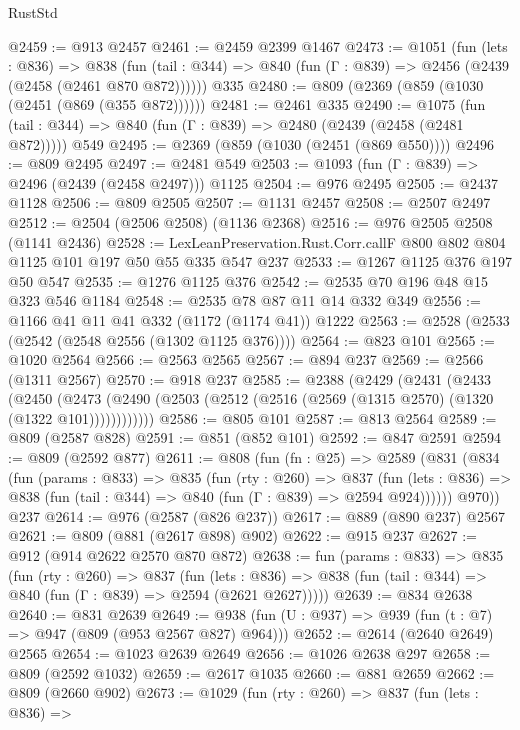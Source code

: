 \begin{lexlean}{RustStd}
\begin{coremodule}
@2459 := @913 @2457
@2461 := @2459 @2399 @1467
@2473 := @1051
    (fun (lets : @836) =>
    @838 (fun (tail : @344) => @840 (fun (Γ : @839) => @2456 (@2439 (@2458 (@2461 @870 @872))))))
    @335
@2480 := @809 (@2369 (@859 (@1030 (@2451 (@869 (@355 @872))))))
@2481 := @2461 @335
@2490 := @1075
    (fun (tail : @344) => @840 (fun (Γ : @839) => @2480 (@2439 (@2458 (@2481 @872)))))
    @549
@2495 := @2369 (@859 (@1030 (@2451 (@869 @550))))
@2496 := @809 @2495
@2497 := @2481 @549
@2503 := @1093 (fun (Γ : @839) => @2496 (@2439 (@2458 @2497))) @1125
@2504 := @976 @2495
@2505 := @2437 @1128
@2506 := @809 @2505
@2507 := @1131 @2457
@2508 := @2507 @2497
@2512 := @2504 (@2506 @2508) (@1136 @2368)
@2516 := @976 @2505 @2508 (@1141 @2436)
@2528 := LexLeanPreservation.Rust.Corr.callF @800 @802 @804 @1125 @101 @197 @50 @55 @335 @547 @237
@2533 := @1267 @1125 @376 @197 @50 @547
@2535 := @1276 @1125 @376
@2542 := @2535 @70 @196 @48 @15 @323 @546 @1184
@2548 := @2535 @78 @87 @11 @14 @332 @349
@2556 := @1166 @41 @11 @41 @332 (@1172 (@1174 @41)) @1222
@2563 := @2528 (@2533 (@2542 (@2548 @2556 (@1302 @1125 @376))))
@2564 := @823 @101
@2565 := @1020 @2564
@2566 := @2563 @2565
@2567 := @894 @237
@2569 := @2566 (@1311 @2567)
@2570 := @918 @237
@2585 := @2388
    (@2429
      (@2431
        (@2433
          (@2450
            (@2473 (@2490 (@2503 (@2512 (@2516 (@2569 (@1315 @2570) (@1320 (@1322 @101))))))))))))
@2586 := @805 @101
@2587 := @813 @2564
@2589 := @809 (@2587 @828)
@2591 := @851 (@852 @101)
@2592 := @847 @2591
@2594 := @809 (@2592 @877)
@2611 := @808
    (fun (fn : @25) =>
    @2589
      (@831
        (@834
          (fun (params : @833) =>
          @835
            (fun (rty : @260) =>
            @837
              (fun (lets : @836) =>
              @838 (fun (tail : @344) => @840 (fun (Γ : @839) => @2594 @924))))))
        @970))
    @237
@2614 := @976 (@2587 (@826 @237))
@2617 := @889 (@890 @237) @2567
@2621 := @809 (@881 (@2617 @898) @902)
@2622 := @915 @237
@2627 := @912 (@914 @2622 @2570 @870 @872)
@2638 := fun (params : @833) =>
  @835
    (fun (rty : @260) =>
    @837
      (fun (lets : @836) =>
      @838 (fun (tail : @344) => @840 (fun (Γ : @839) => @2594 (@2621 @2627)))))
@2639 := @834 @2638
@2640 := @831 @2639
@2649 := @938 (fun (U : @937) => @939 (fun (t : @7) => @947 (@809 (@953 @2567 @827) @964)))
@2652 := @2614 (@2640 @2649) @2565
@2654 := @1023 @2639 @2649
@2656 := @1026 @2638 @297
@2658 := @809 (@2592 @1032)
@2659 := @2617 @1035
@2660 := @881 @2659
@2662 := @809 (@2660 @902)
@2673 := @1029
    (fun (rty : @260) =>
    @837
      (fun (lets : @836) =>

\end{coremodule}
\end{lexlean}
